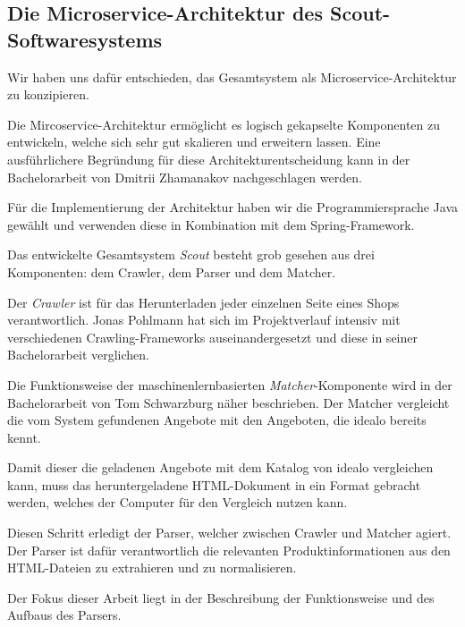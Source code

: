 \subsection{Die Microservice-Architektur des Scout-Softwaresystems}
\label{subsec:microservice-architektur}

Wir haben uns dafür entschieden, das Gesamtsystem als Microservice-Architektur zu konzipieren.

Die Mircoservice-Architektur ermöglicht es logisch gekapselte Komponenten zu entwickeln, welche sich sehr gut
skalieren und erweitern lassen.
Eine ausführlichere Begründung für diese Architekturentscheidung kann in der Bachelorarbeit von Dmitrii
Zhamanakov nachgeschlagen werden.

Für die Implementierung der Architektur haben wir die Programmiersprache Java gewählt und verwenden diese in
Kombination mit dem Spring-Framework\footnotemark.

Das entwickelte Gesamtsystem \textit{Scout} besteht grob gesehen aus drei Komponenten: dem Crawler, dem Parser und dem
Matcher.

Der \textit{Crawler} ist für das Herunterladen jeder einzelnen Seite eines Shops verantwortlich.
Jonas Pohlmann hat sich im Projektverlauf intensiv mit verschiedenen Crawling-Frameworks auseinandergesetzt und diese
in seiner Bachelorarbeit verglichen.

Die Funktionsweise der maschinenlernbasierten \textit{Matcher}-Komponente wird in der Bachelorarbeit von Tom
Schwarzburg näher beschrieben.
Der Matcher vergleicht die vom System gefundenen Angebote mit den Angeboten, die idealo bereits kennt.

Damit dieser die geladenen Angebote mit dem Katalog von idealo vergleichen kann, muss das heruntergeladene
HTML-Dokument in ein Format gebracht werden, welches der Computer für den Vergleich nutzen kann.

Diesen Schritt erledigt der Parser, welcher zwischen Crawler und Matcher agiert.
Der Parser ist dafür verantwortlich die relevanten Produktinformationen aus den HTML-Dateien zu extrahieren und zu
normalisieren.

Der Fokus dieser Arbeit liegt in der Beschreibung der Funktionsweise und des Aufbaus des Parsers.